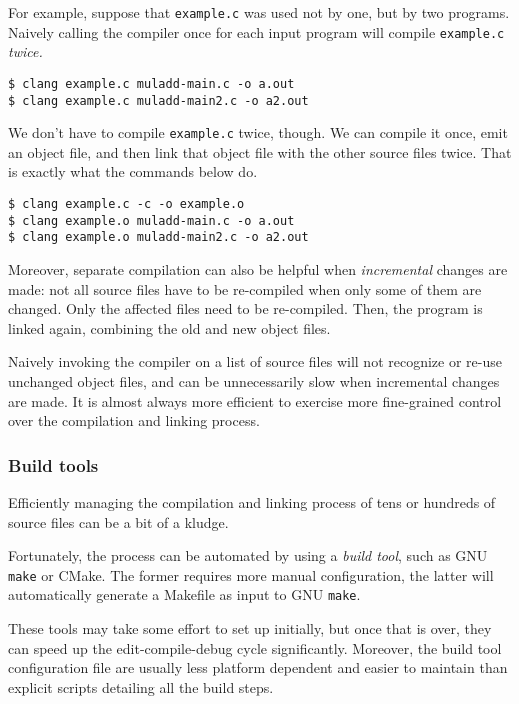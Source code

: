 \documentclass[12pt,a4paper]{article}
\newcommand{\gnu}{GNU}
\newcommand{\gnumake}{\gnu{} \texttt{make}}
\newcommand{\cmake}{CMake}
\newcommand{\filename}[1]{\texttt{#1}}
\begin{document}
For example, suppose that \filename{example.c} was used not by one, but by two programs. Naively calling the compiler once for each input program will compile \filename{example.c} \emph{twice.}\\

\begin{lstlisting}[caption=compiling and linking twice]
$ clang example.c muladd-main.c -o a.out
$ clang example.c muladd-main2.c -o a2.out
\end{lstlisting}

We don't have to compile \filename{example.c} twice, though. We can compile it once, emit an object file, and then link that object file with the other source files twice. That is exactly what the commands below do.\\

\begin{lstlisting}[caption=compiling once and linking twice]
$ clang example.c -c -o example.o
$ clang example.o muladd-main.c -o a.out
$ clang example.o muladd-main2.c -o a2.out
\end{lstlisting}

Moreover, separate compilation can also be helpful when \emph{incremental} changes are made: not all source files have to be re-compiled when only some of them are changed. Only the affected files need to be re-compiled. Then, the program is linked again, combining the old and new object files.

Naively invoking the compiler on a list of source files will not recognize or re-use unchanged object files, and can be unnecessarily slow when incremental changes are made. It is almost always more efficient to exercise more fine-grained control over the compilation and linking process.

\subsubsection{Build tools}

Efficiently managing the compilation and linking process of tens or hundreds of source files can be a bit of a kludge.

Fortunately, the process can be automated by using a \emph{build tool}, such as \gnumake{} or \cmake{}. The former requires more manual configuration, the latter will automatically generate a Makefile as input to \gnumake{}.

These tools may take some effort to set up initially, but once that is over, they can speed up the edit-compile-debug cycle significantly. Moreover, the build tool configuration file are usually less platform dependent and easier to maintain than explicit scripts detailing all the build steps.
\end{document}
